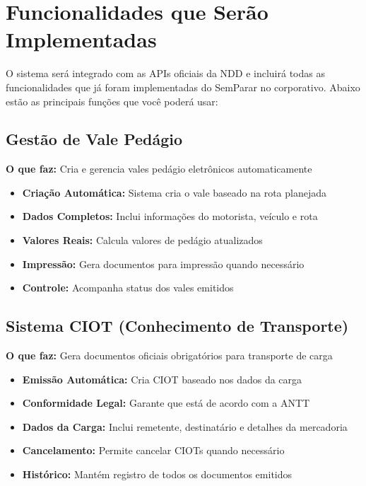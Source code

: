 \documentclass[12pt,a4paper]{article}
\begin{document}
\section{Funcionalidades que Serão Implementadas}

O sistema será integrado com as APIs oficiais da NDD e incluirá todas as funcionalidades que já foram implementadas do SemParar no corporativo. Abaixo estão as principais funções que você poderá usar:

\subsection{Gestão de Vale Pedágio}
\textbf{O que faz:} Cria e gerencia vales pedágio eletrônicos automaticamente
\begin{itemize}
    \item \textbf{Criação Automática:} Sistema cria o vale baseado na rota planejada
    \item \textbf{Dados Completos:} Inclui informações do motorista, veículo e rota
    \item \textbf{Valores Reais:} Calcula valores de pedágio atualizados
    \item \textbf{Impressão:} Gera documentos para impressão quando necessário
    \item \textbf{Controle:} Acompanha status dos vales emitidos
\end{itemize}

\subsection{Sistema CIOT (Conhecimento de Transporte)}
\textbf{O que faz:} Gera documentos oficiais obrigatórios para transporte de carga
\begin{itemize}
    \item \textbf{Emissão Automática:} Cria CIOT baseado nos dados da carga
    \item \textbf{Conformidade Legal:} Garante que está de acordo com a ANTT
    \item \textbf{Dados da Carga:} Inclui remetente, destinatário e detalhes da mercadoria
    \item \textbf{Cancelamento:} Permite cancelar CIOTs quando necessário
    \item \textbf{Histórico:} Mantém registro de todos os documentos emitidos
\end{itemize}
\end{document}

